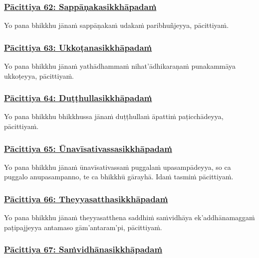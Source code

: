 \subsubsection*{\hyperref[exp62]{Pācittiya 62: Sappāṇakasikkhāpadaṁ}}
\label{pac62}

Yo pana bhikkhu jānaṁ sappāṇakaṁ udakaṁ paribhuñjeyya, pācittiyaṁ.



\subsubsection*{\hyperref[exp63]{Pācittiya 63: Ukkoṭanasikkhāpadaṁ}}
\label{pac63}

Yo pana bhikkhu jānaṁ yathādhammaṁ nihat'ādhikaraṇaṁ punakammāya ukkoṭeyya, pācittiyaṁ.



\subsubsection*{\hyperref[exp64]{Pācittiya 64: Duṭṭhullasikkhāpadaṁ}}
\label{pac64}

Yo pana bhikkhu bhikkhussa jānaṁ duṭṭhullaṁ āpattiṁ paṭicchādeyya, pācittiyaṁ.



\subsubsection*{\hyperref[exp65]{Pācittiya 65: Ūnavīsativassasikkhāpadaṁ}}
\label{pac65}

Yo pana bhikkhu jānaṁ ūnavīsativassaṁ puggalaṁ upasampādeyya, so ca puggalo anupasampanno, te ca bhikkhū gārayhā. Idaṁ tasmiṁ pācittiyaṁ.



\subsubsection*{\hyperref[exp66]{Pācittiya 66: Theyyasatthasikkhāpadaṁ}}
\label{pac66}

Yo pana bhikkhu jānaṁ theyyasatthena saddhiṁ saṁvidhāya ek'addhānamaggaṁ paṭipajjeyya antamaso gām'antaram'pi, pācittiyaṁ.



\subsubsection*{\hyperref[exp67]{Pācittiya 67: Saṁvidhānasikkhāpadaṁ}}
\label{pac67}

